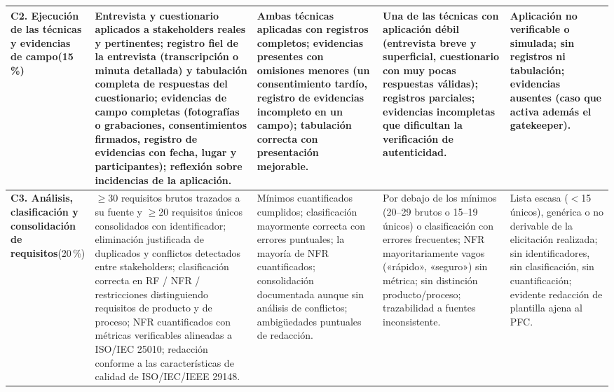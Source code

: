 \documentclass[11pt]{article}
\begin{document}
\begin{landscape}
{\begin{longtable}{|L{3.3cm}|L{4.75cm}|L{4.75cm}|L{4.75cm}|L{4.75cm}|}
\textbf{C2. Ejecución de las técnicas y evidencias de campo}\newline{}(15\,\%) &
Entrevista y cuestionario aplicados a stakeholders reales y pertinentes; registro fiel de la entrevista (transcripción o minuta detallada) y tabulación completa de respuestas del cuestionario; evidencias de campo completas (fotografías o grabaciones, consentimientos firmados, registro de evidencias con fecha, lugar y participantes); reflexión sobre incidencias de la aplicación. &
Ambas técnicas aplicadas con registros completos; evidencias presentes con omisiones menores (un consentimiento tardío, registro de evidencias incompleto en un campo); tabulación correcta con presentación mejorable. &
Una de las técnicas con aplicación débil (entrevista breve y superficial, cuestionario con muy pocas respuestas válidas); registros parciales; evidencias incompletas que dificultan la verificación de autenticidad. &
Aplicación no verificable o simulada; sin registros ni tabulación; evidencias ausentes (caso que activa además el gatekeeper).\\
\hline

\textbf{C3. Análisis, clasificación y consolidación de requisitos}\newline{}(20\,\%) &
$\geq$30 requisitos brutos trazados a su fuente y $\geq$20 requisitos únicos consolidados con identificador; eliminación justificada de duplicados y conflictos detectados entre stakeholders; clasificación correcta en RF / NFR / restricciones distinguiendo requisitos de producto y de proceso; NFR cuantificados con métricas verificables alineadas a ISO/IEC 25010; redacción conforme a las características de calidad de ISO/IEC/IEEE 29148. &
Mínimos cuantificados cumplidos; clasificación mayormente correcta con errores puntuales; la mayoría de NFR cuantificados; consolidación documentada aunque sin análisis de conflictos; ambigüedades puntuales de redacción. &
Por debajo de los mínimos (20--29 brutos o 15--19 únicos) o clasificación con errores frecuentes; NFR mayoritariamente vagos («rápido», «seguro») sin métrica; sin distinción producto/proceso; trazabilidad a fuentes inconsistente. &
Lista escasa ($<$15 únicos), genérica o no derivable de la elicitación realizada; sin identificadores, sin clasificación, sin cuantificación; evidente redacción de plantilla ajena al PFC.\\
\hline


\end{longtable}}
\end{landscape}
\end{document}
